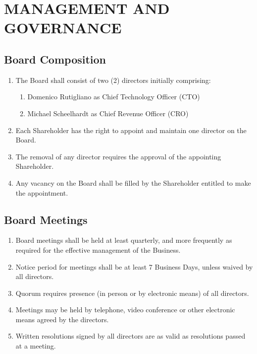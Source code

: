 \section{MANAGEMENT AND GOVERNANCE}

\subsection{Board Composition}
\begin{enumerate}[label=(\alph*)]
\item The Board shall consist of two (2) directors initially comprising:
    \begin{enumerate}[label=(\roman*)]
    \item Domenico Rutigliano as Chief Technology Officer (CTO)
    \item Michael Scheelhardt as Chief Revenue Officer (CRO)
    \end{enumerate}
\item Each Shareholder has the right to appoint and maintain one director on the Board.
\item The removal of any director requires the approval of the appointing Shareholder.
\item Any vacancy on the Board shall be filled by the Shareholder entitled to make the appointment.
\end{enumerate}

\subsection{Board Meetings}
\begin{enumerate}[label=(\alph*)]
\item Board meetings shall be held at least quarterly, and more frequently as required for the effective management of the Business.
\item Notice period for meetings shall be at least 7 Business Days, unless waived by all directors.
\item Quorum requires presence (in person or by electronic means) of all directors.
\item Meetings may be held by telephone, video conference or other electronic means agreed by the directors.
\item Written resolutions signed by all directors are as valid as resolutions passed at a meeting.
\end{enumerate}

